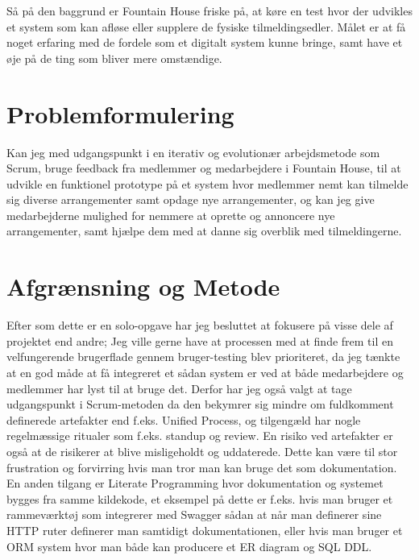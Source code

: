 \documentclass[../main]{subfiles}
\begin{document}
    Så på den baggrund er Fountain House friske på, at køre en test hvor der udvikles et system som kan afløse eller supplere de fysiske tilmeldingsedler.
    \enskip
    Målet er at få noget erfaring med de fordele som et digitalt system kunne bringe, samt have et øje på de ting som bliver mere omstændige.


\section{Problemformulering}
    Kan jeg med udgangspunkt i en iterativ og evolutionær arbejdsmetode som Scrum, bruge feedback fra medlemmer og medarbejdere i Fountain House, til at udvikle en funktionel prototype på et system hvor medlemmer nemt kan tilmelde sig diverse arrangementer samt opdage nye arrangementer, og kan jeg give medarbejderne mulighed for nemmere at oprette og annoncere nye arrangementer, samt hjælpe dem med at danne sig overblik med tilmeldingerne.


\section{Afgrænsning og Metode}
    Efter som dette er en solo-opgave har jeg besluttet at fokusere på visse dele af projektet end  andre;
    \enskip
    Jeg ville gerne have at processen med at finde frem til en velfungerende brugerflade gennem bruger-testing blev prioriteret, da jeg tænkte at en god måde at få integreret et sådan system er ved at både medarbejdere og medlemmer har lyst til at bruge det.
    \enskip
    Derfor har jeg også valgt at tage udgangspunkt i Scrum-metoden da den bekymrer sig mindre om fuldkomment definerede artefakter end f.eks. Unified Process, og tilgengæld har nogle regelmæssige ritualer som f.eks. standup og review.
    \enskip
    En risiko ved artefakter er også at de risikerer at blive misligeholdt og uddaterede. Dette kan være til stor frustration og forvirring hvis man tror man kan bruge det som dokumentation. En anden tilgang er Literate Programming hvor dokumentation og systemet bygges fra samme kildekode, et eksempel på dette er f.eks. hvis man bruger et rammeværktøj som integrerer med Swagger sådan at når man definerer sine HTTP ruter definerer man samtidigt dokumentationen, eller hvis man bruger et ORM system hvor man både kan producere et ER diagram og SQL DDL.
\end{document}
